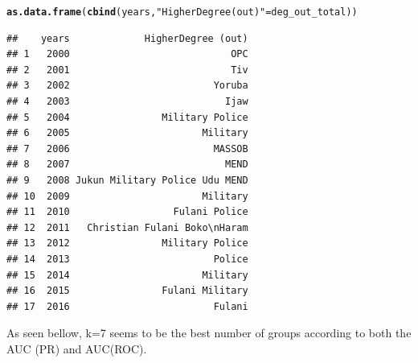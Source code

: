 \documentclass[12pt, letterpaper, notitlepage, onecolumn, twoside, openbib]{article}\usepackage[]{graphicx}\usepackage[]{color}
\makeatletter
\newcommand{\hlstr}[1]{\textcolor[rgb]{0.192,0.494,0.8}{#1}}%
\newcommand{\hlstd}[1]{\textcolor[rgb]{0.345,0.345,0.345}{#1}}%
\newcommand{\hlkwd}[1]{\textcolor[rgb]{0.737,0.353,0.396}{\textbf{#1}}}%
\newenvironment{kframe}{%
 \def\at@end@of@kframe{}%
 \ifinner\ifhmode%
  \def\at@end@of@kframe{\end{minipage}}%
  \begin{minipage}{\columnwidth}%
 \fi\fi%
 \def\FrameCommand##1{\hskip\@totalleftmargin \hskip-\fboxsep
 \colorbox{shadecolor}{##1}\hskip-\fboxsep
     \hskip-\linewidth \hskip-\@totalleftmargin \hskip\columnwidth}%
 \MakeFramed {\advance\hsize-\width
   \@totalleftmargin\z@ \linewidth\hsize
   \@setminipage}}%
 {\par\unskip\endMakeFramed%
 \at@end@of@kframe}
\newenvironment{knitrout}{}{} %
\makeatother
\begin{document}
\begin{knitrout}
\begin{kframe}
\begin{verbatim}
\end{verbatim}
\begin{alltt}
\hlkwd{as.data.frame}\hlstd{(}\hlkwd{cbind}\hlstd{(years,} \hlstr{"HigherDegree (out)"}\hlstd{=deg_out_total))}
\end{alltt}
\begin{verbatim}
##    years             HigherDegree (out)
## 1   2000                            OPC
## 2   2001                            Tiv
## 3   2002                         Yoruba
## 4   2003                           Ijaw
## 5   2004                Military Police
## 6   2005                       Military
## 7   2006                         MASSOB
## 8   2007                           MEND
## 9   2008 Jukun Military Police Udu MEND
## 10  2009                       Military
## 11  2010                  Fulani Police
## 12  2011   Christian Fulani Boko\nHaram
## 13  2012                Military Police
## 14  2013                         Police
## 15  2014                       Military
## 16  2015                Fulani Military
## 17  2016                         Fulani
\end{verbatim}
\end{kframe}
\end{knitrout}


As seen bellow, k=7 seems to be the best number of groups according to both the AUC (PR) and AUC(ROC).
\end{document}
